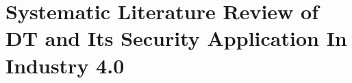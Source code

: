 % 


\chapter{Systematic Literature Review of DT and Its Security Application In Industry 4.0} %
\label{Chapter2} %







